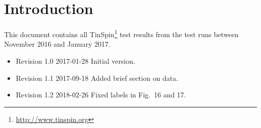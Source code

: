 \documentclass{vldb}
\makeatletter
\def\doi#1{\gdef\@doi{#1}}\def\@doi{}
\makeatother
\begin{document}
\date{17 January 2017}






\maketitle

\section{Introduction}

This document contains all TinSpin\footnote{\url{http://www.tinspin.org}} test results from the test runs between November 2016 and January 2017.

\begin{itemize}
	\item Revision 1.0 2017-01-28 Initial version.
	\item Revision 1.1 2017-09-18 Added brief section on data.
	\item Revision 1.2 2018-02-26 Fixed labels in Fig.~16 and 17.
\end{itemize}
\end{document}
